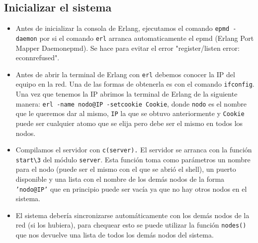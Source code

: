 \documentclass[a4paper]{article}
\newcommand{\blacktr}[0]{\item[$\blacktriangleright$]}
\begin{document}
\subsection*{Inicializar el sistema}
\begin{itemize}
    \blacktr Antes de inicializar la consola de Erlang, ejecutamos el comando \texttt{\textdollar epmd -daemon} por si el comando \texttt{\textdollar erl} arranca automaticamente el epmd (Erlang  Port  Mapper  Daemonepmd). Se hace para evitar el error "register/listen error: econnrefused".
    
    \blacktr Antes de abrir la terminal de Erlang con \texttt{\textdollar erl} debemos conocer la IP del equipo en la red. Una de las formas de obtenerla es con el comando \texttt{\textdollar ifconfig}. Una vez que tenemos la IP abrimos la terminal de Erlang de la siguiente manera: \texttt{erl -name nodo@IP -setcookie Cookie}, donde \texttt{nodo} es el nombre que le queremos dar al mismo, \texttt{IP} la que se obtuvo anteriormente y \texttt{Cookie} puede ser cualquier atomo que se elija pero debe ser el mismo en todos los nodos.
    
    \blacktr Compilamos el servidor con \texttt{c(server).} El servidor se arranca con la función \texttt{start\textbackslash3} del módulo \texttt{server}. Esta función toma como parámetros un nombre para el nodo (puede ser el mismo con el que se abrió el shell), un puerto disponible y una lista con el nombre de los demás nodos de la forma \texttt{'nodo@IP'} que en principio puede ser vacía ya que no hay otros nodos en el sistema. 

    \blacktr El sistema debería sincronizarse automáticamente con los demás nodos de la red (si los hubiera), para chequear esto se puede utilizar la función \texttt{nodes()} que nos devuelve una lista de todos los demás nodos del sistema.

\end{itemize}
\end{document}
